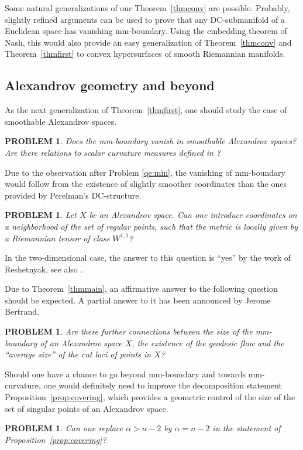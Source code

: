 \documentclass[12pt,leqno,intlimits]{amsart}
\numberwithin{equation}{section}
\newtheorem{quest}[thm]{PROBLEM}
\theoremstyle{definition}
\theoremstyle{remark}
\newcommand{\tref}[1]{Theorem~\ref{#1}}
\newcommand{\pref}[1]{Proposition~\ref{#1}}
\begin{document}
Some natural generalizations of our \tref{thmconv} are possible. Probably, slightly refined arguments can be used to
prove that any DC-submanifold of a Euclidean space has vanishing mm-boundary. Using the embedding theorem of Nash, this would also provide an easy generalization of \tref{thmconv} and \tref{thmfirst} to convex hypersurfaces of smooth Riemannian manifolds.

\subsection{Alexandrov geometry and beyond}
As the next generalization of \tref{thmfirst}, one should study the case of smoothable Alexandrov spaces.

\begin{quest}
Does the mm-boundary vanish in smoothable Alexandrov spaces? Are there relations to scalar curvature measures defined in \cite{LP}?
\end{quest}

Due to the observation after Problem \ref{qe:min}, the vanishing of mm-boundary would follow from the existence of slightly smoother coordinates than the ones provided by Perelman's DC-structure.
\begin{quest}
Let $X$ be an Alexandrov space. Can one introduce coordinates on a neighborhood of the set of regular points, such that the metric is locally given by a Riemannian tensor of class $W^{1,1}$?
\end{quest}
In the two-dimensional case, the answer to this question is ``yes'' by the work of Reshetnyak,  see also \cite{AB16}. 


Due to \tref{thmmain}, an affirmative answer to the following question should be expected. A partial answer to it has been announced by Jerome Bertrand.
\begin{quest}
Are there further connections between the size of the mm-boundary of an Alexandrov space $X$, the existence of the geodesic flow  and the ``average size'' of the cut loci of points in $X$?
\end{quest}

Should one have a chance to go beyond mm-boundary and towards mm-curvature, one would definitely need to improve the
decomposition statement \pref{prop:covering}, which provides a geometric control of the size of the set of singular points of an Alexandrov space.

\begin{quest} \label{qe:control}
Can one replace $\alpha>n-2$ by $\alpha=n-2$ in the statement of \pref{prop:covering}?
\end{quest}
\end{document}
